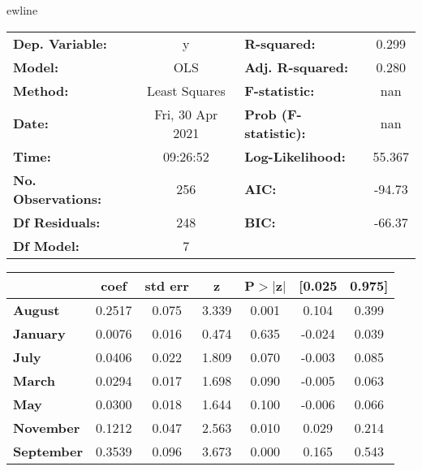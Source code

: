ewline\begin{center}
\begin{tabular}{lclc}
\toprule
\textbf{Dep. Variable:}    &        y         & \textbf{  R-squared:         } &     0.299   \\
\textbf{Model:}            &       OLS        & \textbf{  Adj. R-squared:    } &     0.280   \\
\textbf{Method:}           &  Least Squares   & \textbf{  F-statistic:       } &       nan   \\
\textbf{Date:}             & Fri, 30 Apr 2021 & \textbf{  Prob (F-statistic):} &      nan    \\
\textbf{Time:}             &     09:26:52     & \textbf{  Log-Likelihood:    } &    55.367   \\
\textbf{No. Observations:} &         256      & \textbf{  AIC:               } &    -94.73   \\
\textbf{Df Residuals:}     &         248      & \textbf{  BIC:               } &    -66.37   \\
\textbf{Df Model:}         &           7      & \textbf{                     } &             \\
\bottomrule
\end{tabular}
\begin{tabular}{lcccccc}
                   & \textbf{coef} & \textbf{std err} & \textbf{z} & \textbf{P$> |$z$|$} & \textbf{[0.025} & \textbf{0.975]}  \\
\midrule
\textbf{August}    &       0.2517  &        0.075     &     3.339  &         0.001        &        0.104    &        0.399     \\
\textbf{January}   &       0.0076  &        0.016     &     0.474  &         0.635        &       -0.024    &        0.039     \\
\textbf{July}      &       0.0406  &        0.022     &     1.809  &         0.070        &       -0.003    &        0.085     \\
\textbf{March}     &       0.0294  &        0.017     &     1.698  &         0.090        &       -0.005    &        0.063     \\
\textbf{May}       &       0.0300  &        0.018     &     1.644  &         0.100        &       -0.006    &        0.066     \\
\textbf{November}  &       0.1212  &        0.047     &     2.563  &         0.010        &        0.029    &        0.214     \\
\textbf{September} &       0.3539  &        0.096     &     3.673  &         0.000        &        0.165    &        0.543     \\

\end{tabular}
\end{center}

